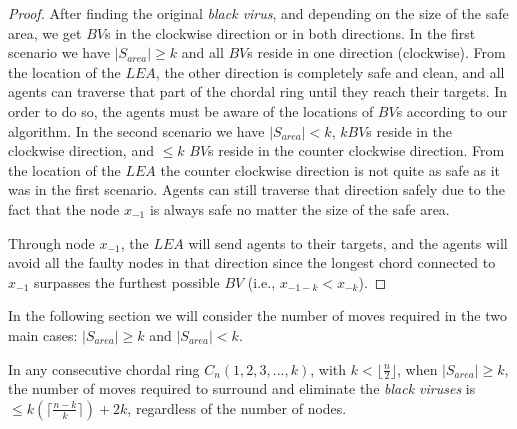 \begin{proof}
After finding the original {\it black virus}, and depending on the size of the safe area, we get $BV$s in the clockwise direction or in both directions. In the first scenario we have $|S_{area}|\ge k$ and all $BV$s reside in one direction (clockwise). From the location of the $LEA$, the other direction is completely safe and clean,   and all agents can  traverse that part of the chordal ring until they reach their targets. In order to do so, the agents must be aware of the locations of $BV$s according to our algorithm. 
In the second scenario we have  $|S_{area}|< k$, $ k$$BV$s reside in the clockwise direction, and $\leq k$ $BV$s reside in the counter clockwise direction. From the location of the $LEA$ the counter clockwise direction is not quite as safe as it was in the first scenario. Agents can still traverse that direction safely due to the fact that the node $x_{-1}$ is always safe no matter the size of the safe area. 

Through node $x_{-1}$, the $LEA$ will send agents to their targets, and the agents will avoid all the faulty nodes in that direction since the longest chord connected to $x_{-1}$ surpasses the furthest possible $BV$ (i.e., $x_{-1-k} < x_{-k}$).

\end{proof}

In the following section we will consider the number of moves required  in the two main cases: $|S_{area}|\ge k$ and  $|S_{area}|< k$.
\begin{theorem}
In any consecutive chordal ring $C_n(1,2,3,...,k)$, with  $ k  < \lfloor\frac{n}{2}\rfloor$, when $|S_{area}|\ge k$, the number of moves required to surround and eliminate the {\it black viruses} is $\leq k(\lceil \frac {n-k}{k} \rceil) +2k$, regardless of the number of nodes.
\end{theorem}



